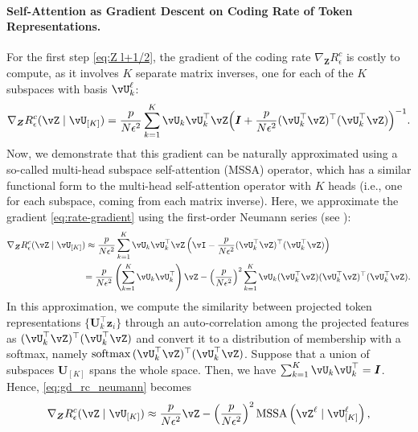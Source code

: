\documentclass[\toplevelprefix/book-main.tex]{subfiles}
\begin{document}
\paragraph{Self-Attention as Gradient Descent on Coding Rate of Token Representations.} For the first step \eqref{eq:Z l+1/2}, the gradient of the coding rate \(\nabla_{\bm Z} R^c_\epsilon\) is costly to compute, as it involves \(K\) separate matrix inverses, one for each of the \(K\) subspaces with basis \(\vU_{k}^{\ell}\):
\begin{equation}
    \nabla_{\bm Z} R_{\epsilon}^c(\vZ \mid \vU_{[K]})
    = \frac{p}{N\epsilon^2}\sum_{k=1}^K \vU_k\vU_k^\top\vZ\Big(\I +
    \frac{p}{N\epsilon^2}(\vU_k^\top\vZ)^\top(\vU_k^\top\vZ)\Big)^{-1}.
    \label{eq:rate-gradient}
\end{equation}
Now, we demonstrate that this gradient can be naturally approximated using a so-called multi-head subspace self-attention (MSSA) operator, which has a similar functional form to the multi-head self-attention operator \citep{vaswani2017attention} with \(K\) heads (i.e., one for each subspace, coming from each matrix inverse). Here, we approximate the gradient \eqref{eq:rate-gradient} using the first-order Neumann series (see ):
\begin{align}\label{eq:gd_rc_neumann}
    \nabla_{\bm Z} R_{\epsilon}^{c}(\vZ \mid \vU_{[K]}) 
    &\approx \frac{p}{N\epsilon^2} \sum_{k = 1}^{K}\vU_{k}\vU_{k}^\top\vZ\left(\vI - \frac{p}{N\epsilon^2} (\vU_{k}^\top\vZ)^\top(\vU_{k}^\top\vZ)\right) \notag \\
    &{= \frac{p}{N\epsilon^2} \left(\sum_{k = 1}^{K} \vU_{k}\vU_{k}^\top\right)\vZ -  \left( \frac{p}{N\epsilon^2}\right)^2\sum_{k = 1}^{K} \vU_{k}(\vU_{k}^\top\vZ)(\vU_{k}^\top\vZ)^\top(\vU_{k}^\top\vZ)}.
\end{align}
In this approximation, we compute the similarity between projected token representations $\{\bm U_k^\top\bm z_i\}$ through an auto-correlation among the projected features as $(\vU_{k}^\top\vZ)^\top(\vU_{k}^\top\vZ)$ and convert it to a distribution of membership with a softmax, namely $\softmax{(\vU_{k}^\top\vZ)^\top(\vU_{k}^\top\vZ)}$. 
Suppose that a union of subspaces $\bm U_{[K]}$ spans the whole space. Then, we have $\sum_{k = 1}^{K} \vU_{k}\vU_{k}^\top = \bm I$. Hence, \eqref{eq:gd_rc_neumann} becomes
\begin{align}\label{eq:grad Rc}
    \nabla_{\bm Z} R_{\epsilon}^{c}(\vZ \mid \vU_{[K]}) 
     \approx  \frac{p}{N\epsilon^2} \vZ -  \left( \frac{p}{N\epsilon^2}\right)^2 \MSSA\left(\vZ^{\ell} \mid \vU_{[K]}^{\ell}\right),
\end{align}
\end{document}
